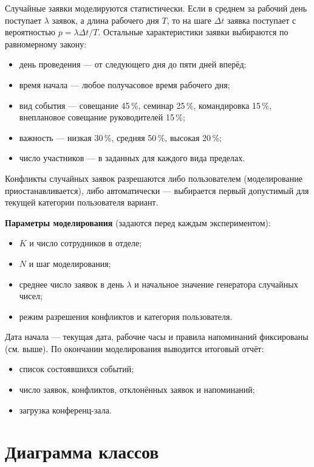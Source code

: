 \documentclass[12pt,a4paper]{article}
\begin{document}
Случайные заявки моделируются статистически. Если в среднем за рабочий день
поступает $\lambda$ заявок, а длина рабочего дня $T$, то на шаге $\Delta t$ заявка
поступает с вероятностью $p = \lambda \Delta t / T$. Остальные характеристики
заявки выбираются по равномерному закону:
\begin{itemize}
  \item день проведения --- от следующего дня до пяти дней вперёд;
  \item время начала --- любое получасовое время рабочего дня;
  \item вид события --- совещание 45\,\%, семинар 25\,\%, командировка 15\,\%,
        внеплановое совещание руководителей 15\,\%;
  \item важность --- низкая 30\,\%, средняя 50\,\%, высокая 20\,\%;
  \item число участников --- в заданных для каждого вида пределах.
\end{itemize}

Конфликты случайных заявок разрешаются либо пользователем (моделирование
приостанавливается), либо автоматически --- выбирается первый допустимый
для текущей категории пользователя вариант.

\textbf{Параметры моделирования} (задаются перед каждым экспериментом):
\begin{itemize}
  \item $K$ и число сотрудников в отделе;
  \item $N$ и шаг моделирования;
  \item среднее число заявок в день $\lambda$ и начальное значение генератора
        случайных чисел;
  \item режим разрешения конфликтов и категория пользователя.
\end{itemize}
Дата начала --- текущая дата, рабочие часы и правила напоминаний фиксированы
(см. выше).
По окончании моделирования выводится итоговый отчёт:
\begin{itemize}
  \item список состоявшихся событий;
  \item число заявок, конфликтов, отклонённых заявок и напоминаний;
  \item загрузка конференц-зала.
\end{itemize}

\section{Диаграмма классов}
\end{document}
